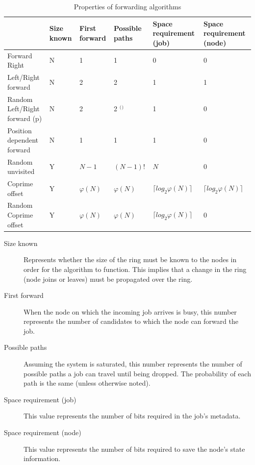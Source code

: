 \documentclass[10pt,a4paper]{article}
\begin{document}
\begin{table}[h!]
\hspace{-0.12\textwidth}
\begin{tabular}{|p{}|p{}|p{}|p{}|p{}|p{}|} \cline{2-6}
\multicolumn{1}{l|}{}		& Size known	& First forward	& Possible paths	& Space requirement (job)	& Space requirement (node) \\ \hline
Forward Right				& N				& 1				& 1					& 0							& 0		\\ \hline
Left/Right forward			& N				& 2				& 2					& 1							& 1		\\ \hline
Random Left/Right forward (p) & N			& 2				& 2 $^($\footnotemark$^)$ & 1					& 0		\\ \hline
Position dependent forward	& N				& 1				& 1					& 1							& 0		\\ \hline
Random unvisited			& Y				& $N-1$			& $(N-1)!$			& $N$	& 0		\\ \hline
Coprime offset				& Y				& $\varphi(N)$		& $\varphi(N)$ 		& $\lceil log_2 \varphi(N) \rceil$	& $\lceil log_2 \varphi(N) \rceil$ \\ \hline
Random Coprime offset		& Y				& $\varphi(N)$		& $\varphi(N)$			& $\lceil log_2 \varphi(N) \rceil$	& 0		\\ \hline
\end{tabular}
\caption{Properties of forwarding algorithms}
\label{tabprops}
\end{table}

\begin{description}
\item[Size known] Represents whether the size of the ring must be known to the nodes in order for the algorithm to function. This implies that a change in the ring (node joins or leaves) must be propagated over the ring.
\item[First forward] When the node on which the incoming job arrives is busy, this number represents the number of candidates to which the node can forward the job.
\item[Possible paths] Assuming the system is saturated, this number represents the number of possible paths a job can travel until being dropped. The probability of each path is the same (unless otherwise noted).
\item[Space requirement (job)] This value represents the number of bits required in the job's metadata.
\item[Space requirement (node)] This value represents the number of bits required to save the node's state information.
\end{description}
\end{document}
